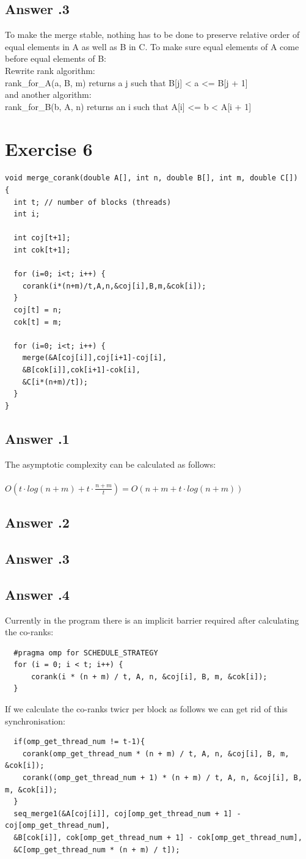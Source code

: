 \documentclass[a4paper,%
11pt,%
DIV=12,
headsepline,%
headings=normal,
]{scrartcl}
\newcounter{curex}
\newcommand{\exercise}[1]{\section*{Exercise #1}\setcounter{curex}{#1}}
\newcommand{\answer}[1]{\subsection*{Answer \arabic{curex}.#1}}
\begin{document}
\answer{3}
To make the merge stable, nothing has to be done to preserve relative order of equal elements in A as well as B in C.
To make sure equal elements of A come before equal elements of B: \\
Rewrite rank algorithm:\\
rank{\_}for{\_}A(a, B, m) returns a j such that B[j] < a <= B[j + 1] \\
and another algorithm: \\
rank{\_}for{\_}B(b, A, n) returns an i such that A[i] <= b < A[i + 1]


\exercise{6}

\begin{lstlisting}
void merge_corank(double A[], int n, double B[], int m, double C[])
{
  int t; // number of blocks (threads)
  int i;
  
  int coj[t+1];
  int cok[t+1];
  
  for (i=0; i<t; i++) {
    corank(i*(n+m)/t,A,n,&coj[i],B,m,&cok[i]);
  }
  coj[t] = n;
  cok[t] = m;
  
  for (i=0; i<t; i++) {
    merge(&A[coj[i]],coj[i+1]-coj[i],
    &B[cok[i]],cok[i+1]-cok[i],
    &C[i*(n+m)/t]);
  }
}
\end{lstlisting}

\answer{1}
The asymptotic complexity can be calculated as follows:\\
\\
$O(t \cdot log(n+m) + t \cdot \frac{n+m}{t}) = O(n + m + t \cdot log(n+m))$
\answer{2}

\answer{3}
\newpage
\answer{4}
Currently in the program there is an implicit barrier required after calculating the co-ranks:\\
  \begin{lstlisting}
  #pragma omp for SCHEDULE_STRATEGY
  for (i = 0; i < t; i++) {
      corank(i * (n + m) / t, A, n, &coj[i], B, m, &cok[i]);
  }
  \end{lstlisting}
If we calculate the co-ranks twicr per block as follows we can get rid of this synchronisation:
  \begin{lstlisting}
  if(omp_get_thread_num != t-1){
    corank(omp_get_thread_num * (n + m) / t, A, n, &coj[i], B, m, &cok[i]);
    corank((omp_get_thread_num + 1) * (n + m) / t, A, n, &coj[i], B, m, &cok[i]);
  }
  seq_merge1(&A[coj[i]], coj[omp_get_thread_num + 1] - coj[omp_get_thread_num], 
  &B[cok[i]], cok[omp_get_thread_num + 1] - cok[omp_get_thread_num], 
  &C[omp_get_thread_num * (n + m) / t]);
  \end{lstlisting}
\end{document}
